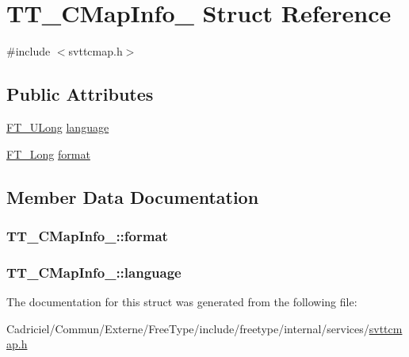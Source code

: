 \hypertarget{struct_t_t___c_map_info__}{\section{T\-T\-\_\-\-C\-Map\-Info\-\_\- Struct Reference}
\label{struct_t_t___c_map_info__}
}


{\ttfamily \#include $<$svttcmap.\-h$>$}

\subsection*{Public Attributes}
\begin{DoxyCompactItemize}
\item 
\hyperlink{fttypes_8h_a4fac88bdba78eb76b505efa6e4fbf3f5}{F\-T\-\_\-\-U\-Long} \hyperlink{struct_t_t___c_map_info___a4096f460af57f87cb9434a411c502d86}{language}
\item 
\hyperlink{fttypes_8h_a7fa72a1f0e79fb1860c5965789024d6f}{F\-T\-\_\-\-Long} \hyperlink{struct_t_t___c_map_info___a122d56b4755597f134fcf4865cb0a4fc}{format}
\end{DoxyCompactItemize}


\subsection{Member Data Documentation}
\hypertarget{struct_t_t___c_map_info___a122d56b4755597f134fcf4865cb0a4fc}{
\subsubsection[{format}]{ T\-T\-\_\-\-C\-Map\-Info\-\_\-\-::format}}\label{struct_t_t___c_map_info___a122d56b4755597f134fcf4865cb0a4fc}
\hypertarget{struct_t_t___c_map_info___a4096f460af57f87cb9434a411c502d86}{
\subsubsection[{language}]{ T\-T\-\_\-\-C\-Map\-Info\-\_\-\-::language}}\label{struct_t_t___c_map_info___a4096f460af57f87cb9434a411c502d86}


The documentation for this struct was generated from the following file\-:\begin{DoxyCompactItemize}
\item 
Cadriciel/\-Commun/\-Externe/\-Free\-Type/include/freetype/internal/services/\hyperlink{svttcmap_8h}{svttcmap.\-h}\end{DoxyCompactItemize}
